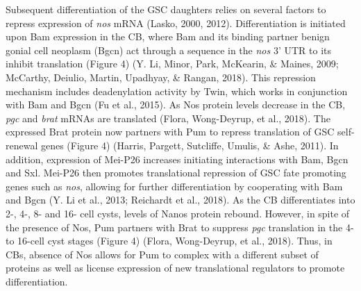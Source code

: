 \documentclass[12pt,oneside]{reedthesis}
\begin{document}
Subsequent differentiation of the GSC daughters relies on several
factors to repress expression of \emph{nos} mRNA (Lasko, 2000, 2012). Differentiation is initiated upon Bam expression in the
CB, where Bam and its binding partner benign gonial cell neoplasm (Bgcn)
act through a sequence in the \emph{nos} 3' UTR to its inhibit translation
(Figure 4) (Y. Li, Minor, Park, McKearin, \& Maines, 2009; McCarthy, Deiulio, Martin, Upadhyay, \& Rangan, 2018). This repression mechanism
includes deadenylation activity by Twin, which works in conjunction with
Bam and Bgcn (Fu et al., 2015). As Nos protein levels decrease in the CB,
\emph{pgc} and \emph{brat} mRNAs are translated (Flora, Wong-Deyrup, et al., 2018). The expressed
Brat protein now partners with Pum to repress translation of GSC
self-renewal genes (Figure 4) (Harris, Pargett, Sutcliffe, Umulis, \& Ashe, 2011). In addition, expression
of Mei-P26 increases initiating interactions with Bam, Bgcn and Sxl.
Mei-P26 then promotes translational repression of GSC fate promoting
genes such as \emph{nos}, allowing for further differentiation by cooperating
with Bam and Bgcn (Y. Li et al., 2013; Reichardt et al., 2018). As the CB
differentiates into 2-, 4-, 8- and 16- cell cysts, levels of Nanos
protein rebound. However, in spite of the presence of Nos, Pum partners
with Brat to suppress \emph{pgc} translation in the 4- to 16-cell cyst stages
(Figure 4) (Flora, Wong-Deyrup, et al., 2018). Thus, in CBs, absence of Nos allows for Pum
to complex with a different subset of proteins as well as license
expression of new translational regulators to promote differentiation.
\end{document}
